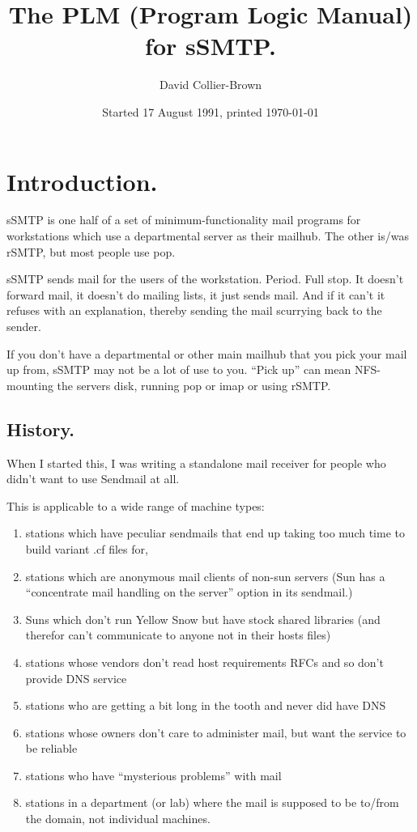 \title{The PLM (Program Logic Manual) for sSMTP.}
\author{David Collier-Brown}
\date{Started 17 August 1991, printed \today}

\maketitle

\section{Introduction.}
    sSMTP is one half of a set of minimum-functionality mail programs for
workstations which use a departmental server as their mailhub.  The other
is/was rSMTP, but most people use pop.

    sSMTP sends mail for the users of the workstation.  Period.  Full stop.
It doesn't forward mail, it doesn't do mailing lists, it just sends mail.
And if it can't it refuses with an explanation, thereby sending the mail
scurrying back to the sender.

   If you don't have a departmental or other main mailhub that you pick your
mail up from, sSMTP may not be a lot of use to you. ``Pick up'' can mean
NFS-mounting the servers disk, running pop or imap or using rSMTP.

\subsection{History.}
   When I started this, I was writing a standalone mail receiver for
people who didn't want to use Sendmail at all.  

  This is applicable to a wide range of machine types:
\begin{enumerate}
	\item stations which have peculiar sendmails that end
		up taking too much time to build variant .cf files for,
	\item stations which are anonymous mail clients of non-sun servers 
		(Sun has a ``concentrate mail handling on the server''
		option in its sendmail.)
	\item Suns which don't run Yellow Snow but have stock shared
		libraries (and therefor can't communicate to anyone not
		in their hosts files)
	\item stations whose vendors don't read host requirements RFCs
		and so don't provide DNS service
	\item stations who are getting a bit long in the tooth and
		never did have DNS
	\item stations whose owners don't care to administer mail, but
		want the service to be reliable\label{reliable}
	\item stations who have ``mysterious problems'' with mail
	\item stations in a department (or lab) where the mail is
		supposed to be to/from the domain, not individual machines.
\end{enumerate}

